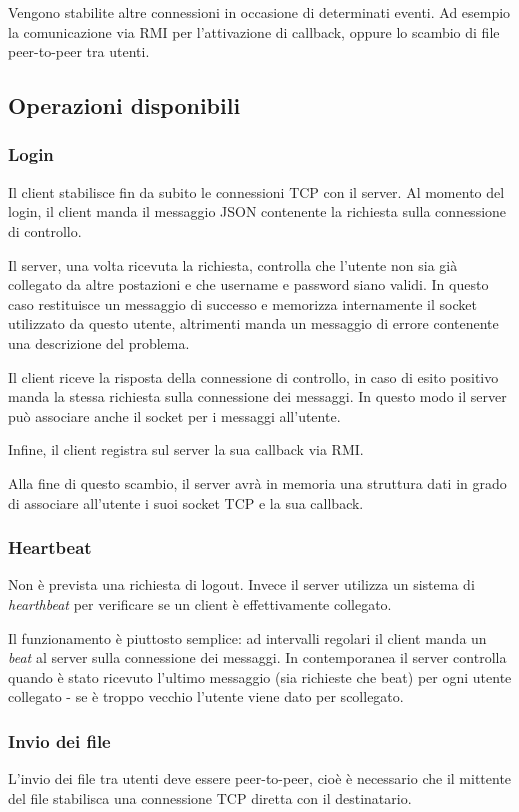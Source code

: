 Vengono stabilite altre connessioni in occasione di determinati eventi. Ad esempio la comunicazione via RMI per l'attivazione di callback, oppure lo scambio di file peer-to-peer tra utenti.
    
\subsection{Operazioni disponibili}
\label{ssec:operazioni}
\subsubsection{Login}
Il client stabilisce fin da subito le connessioni TCP con il server. Al momento del login, il client manda il messaggio JSON contenente la richiesta sulla connessione di controllo.

Il server, una volta ricevuta la richiesta, controlla che l'utente non sia già collegato da altre postazioni e che username e password siano validi. In questo caso restituisce un messaggio di successo e memorizza internamente il socket utilizzato da questo utente, altrimenti manda un messaggio di errore contenente una descrizione del problema.

Il client riceve la risposta della connessione di controllo, in caso di esito positivo manda la stessa richiesta sulla connessione dei messaggi. In questo modo il server può associare anche il socket per i messaggi all'utente.

Infine, il client registra sul server la sua callback via RMI.

Alla fine di questo scambio, il server avrà in memoria una struttura dati in grado di associare all'utente i suoi socket TCP e la sua callback.

\subsubsection{Heartbeat}
Non è prevista una richiesta di logout. Invece il server utilizza un sistema di \textit{hearthbeat} per verificare se un client è effettivamente collegato.

Il funzionamento è piuttosto semplice: ad intervalli regolari il client manda un \textit{beat} al server sulla connessione dei messaggi. In contemporanea il server controlla quando è stato ricevuto l'ultimo messaggio (sia richieste che beat) per ogni utente collegato - se è troppo vecchio l'utente viene dato per scollegato.

\subsubsection{Invio dei file}
L'invio dei file tra utenti deve essere peer-to-peer, cioè è necessario che il mittente del file stabilisca una connessione TCP diretta con il destinatario.

